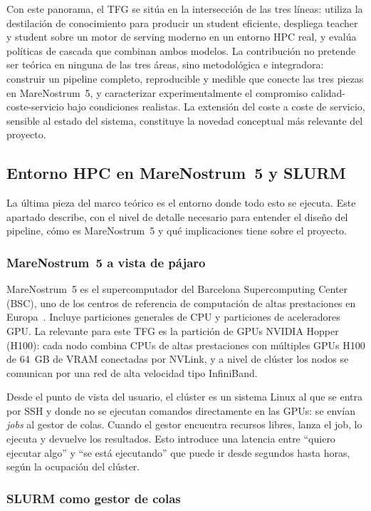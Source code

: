 \documentclass[11pt,a4paper]{article}
\begin{document}
Con este panorama, el TFG se sitúa en la intersección de las tres líneas: utiliza la destilación de conocimiento para producir un student eficiente, despliega teacher y student sobre un motor de serving moderno en un entorno HPC real, y evalúa políticas de cascada que combinan ambos modelos. La contribución no pretende ser teórica en ninguna de las tres áreas, sino metodológica e integradora: construir un pipeline completo, reproducible y medible que conecte las tres piezas en MareNostrum~5, y caracterizar experimentalmente el compromiso calidad-coste-servicio bajo condiciones realistas. La extensión del coste a coste de servicio, sensible al estado del sistema, constituye la novedad conceptual más relevante del proyecto.

\subsection{Entorno HPC en MareNostrum~5 y SLURM}

La última pieza del marco teórico es el entorno donde todo esto se ejecuta. Este apartado describe, con el nivel de detalle necesario para entender el diseño del pipeline, cómo es MareNostrum~5 y qué implicaciones tiene sobre el proyecto.

\subsubsection{MareNostrum~5 a vista de pájaro}

MareNostrum~5 es el supercomputador del Barcelona Supercomputing Center (BSC), uno de los centros de referencia de computación de altas prestaciones en Europa~\cite{mn5}. Incluye particiones generales de CPU y particiones de aceleradores GPU. La relevante para este TFG es la partición de GPUs NVIDIA Hopper (H100): cada nodo combina CPUs de altas prestaciones con múltiples GPUs H100 de 64~GB de VRAM conectadas por NVLink, y a nivel de clúster los nodos se comunican por una red de alta velocidad tipo InfiniBand.

Desde el punto de vista del usuario, el clúster es un sistema Linux al que se entra por SSH y donde no se ejecutan comandos directamente en las GPUs: se envían \textit{jobs} al gestor de colas. Cuando el gestor encuentra recursos libres, lanza el job, lo ejecuta y devuelve los resultados. Esto introduce una latencia entre ``quiero ejecutar algo'' y ``se está ejecutando'' que puede ir desde segundos hasta horas, según la ocupación del clúster.

\subsubsection{SLURM como gestor de colas}
\end{document}
